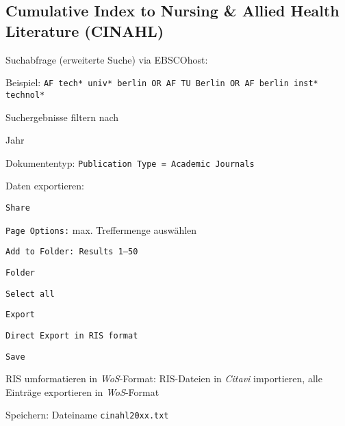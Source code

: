 \subsection*{Cumulative Index to Nursing \& Allied Health Literature (CINAHL)}
\begin{compactitem}
\item Suchabfrage (erweiterte Suche) via EBSCOhost: 
	\begin{compactitem}
	\item Beispiel: \texttt{AF tech* univ* berlin OR AF TU Berlin OR AF berlin inst* technol*}
	\end{compactitem}
\item Suchergebnisse filtern nach
	\begin{compactitem}
    \item Jahr
    \item Dokumententyp: \texttt{Publication Type = Academic Journals}
    \end{compactitem}
\item Daten exportieren: 
	\begin{compactitem}
	\item \texttt{Share}
    \item \texttt{Page Options:} max. Treffermenge auswählen
    \item \texttt{Add to Folder: Results 1--50}
    \item \texttt{Folder}
    \item \texttt{Select all}
    \item \texttt{Export}
    \item \texttt{Direct Export in RIS format}
    \item \texttt{Save}
	\end{compactitem}
\item RIS umformatieren in \textit{WoS}-Format: RIS-Dateien in \textit{Citavi} importieren, alle Einträge exportieren in \textit{WoS}-Format
\item Speichern: Dateiname \texttt{cinahl20xx.txt}
\end{compactitem}

